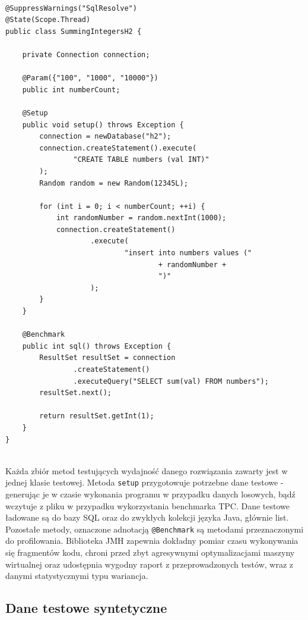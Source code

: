 \documentclass[12pt]{extarticle}
\begin{document}
\begin{lstlisting}[label=testclass, caption=Przykładowa klasa JMH]

@SuppressWarnings("SqlResolve")
@State(Scope.Thread)
public class SummingIntegersH2 {
    
    private Connection connection;
    
    @Param({"100", "1000", "10000"})
    public int numberCount;
    
    @Setup
    public void setup() throws Exception {
        connection = newDatabase("h2");
        connection.createStatement().execute(
                "CREATE TABLE numbers (val INT)"
        );
        Random random = new Random(12345L);
        
        for (int i = 0; i < numberCount; ++i) {
            int randomNumber = random.nextInt(1000);
            connection.createStatement()
                    .execute(
                            "insert into numbers values ("
                                    + randomNumber +
                                    ")"
                    );
        }
    }
    
    @Benchmark
    public int sql() throws Exception {
        ResultSet resultSet = connection
                .createStatement()
                .executeQuery("SELECT sum(val) FROM numbers");
        resultSet.next();
        
        return resultSet.getInt(1);
    }
}


\end{lstlisting}

    Każda zbiór metod testujących wydajność danego rozwiązania zawarty jest w jednej klasie testowej. Metoda \texttt{setup} przygotowuje potrzebne dane testowe - generując je w czasie wykonania programu w przypadku danych losowych, bądź wczytuje z pliku w przypadku wykorzystania benchmarka TPC. Dane testowe ładowane są do bazy SQL oraz do zwykłych kolekcji języka Java, głównie list. Pozostałe metody, oznaczone adnotacją \texttt{@Benchmark} są metodami przeznaczonymi do profilowania. Biblioteka JMH zapewnia dokładny pomiar czasu wykonywania się fragmentów kodu, chroni przed zbyt agresywnymi optymalizacjami maszyny wirtualnej oraz udostępnia wygodny raport z przeprowadzonych testów, wraz z danymi statystycznymi typu wariancja.

\subsection{Dane testowe syntetyczne}
\end{document}
